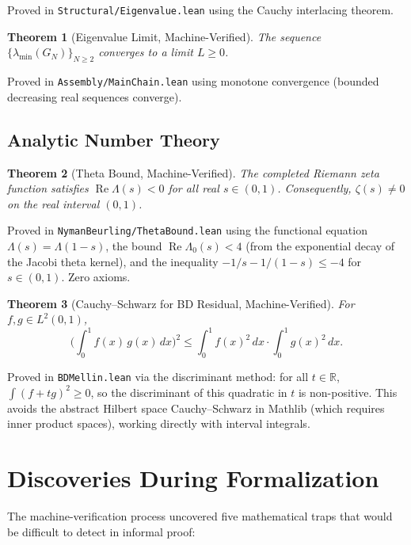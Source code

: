 \documentclass[11pt,a4paper]{article}
\theoremstyle{plain}
\newtheorem{theorem}{Theorem}[section]
\theoremstyle{definition}
\theoremstyle{remark}
\newcommand{\re}{\operatorname{Re}}
\newcommand{\RR}{\mathbb{R}}
\newcommand{\lean}[1]{\texttt{#1}}
\begin{document}
Proved in \lean{Structural/Eigenvalue.lean} using the Cauchy
interlacing theorem.

\begin{theorem}[Eigenvalue Limit, Machine-Verified]
\label{thm:eiglimit}
The sequence $\{\lambda_{\min}(G_N)\}_{N \geq 2}$ converges to a
limit $L \geq 0$.
\end{theorem}

Proved in \lean{Assembly/MainChain.lean} using monotone convergence
(bounded decreasing real sequences converge).

\subsection{Analytic Number Theory}

\begin{theorem}[Theta Bound, Machine-Verified]
\label{thm:theta}
The completed Riemann zeta function satisfies
$\re\Lambda(s) < 0$ for all real $s \in (0,1)$. Consequently,
$\zeta(s) \neq 0$ on the real interval $(0,1)$.
\end{theorem}

Proved in \lean{NymanBeurling/ThetaBound.lean} using the functional
equation $\Lambda(s) = \Lambda(1-s)$, the bound
$\re\Lambda_0(s) < 4$ (from the exponential decay of the Jacobi
theta kernel), and the inequality $-1/s - 1/(1-s) \leq -4$
for $s \in (0,1)$. Zero axioms.

\begin{theorem}[Cauchy--Schwarz for BD Residual, Machine-Verified]
\label{thm:csbd}
For $f, g \in L^2(0,1)$,
\[
  \biggl(\int_0^1 f(x)\,g(x)\,dx\biggr)^2 \leq
  \int_0^1 f(x)^2\,dx \cdot \int_0^1 g(x)^2\,dx.
\]
\end{theorem}

Proved in \lean{BDMellin.lean} via the discriminant method: for all
$t \in \RR$, $\int(f + tg)^2 \geq 0$, so the discriminant of this
quadratic in $t$ is non-positive. This avoids the abstract Hilbert
space Cauchy--Schwarz in Mathlib (which requires inner product spaces),
working directly with interval integrals.

\section{Discoveries During Formalization}
\label{sec:traps}

The machine-verification process uncovered five mathematical traps
that would be difficult to detect in informal proof:
\end{document}
